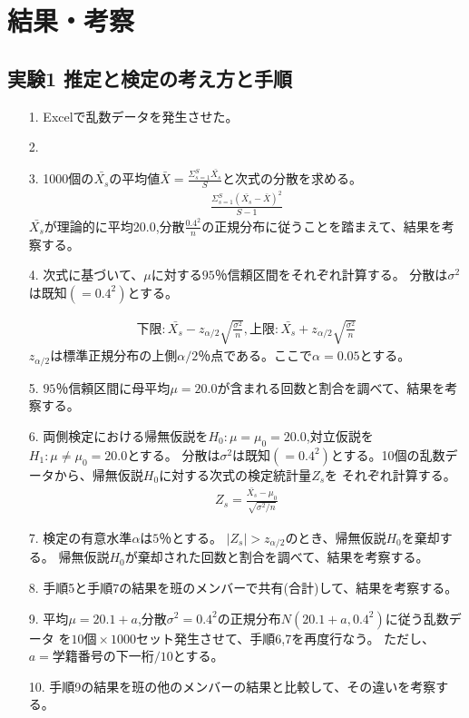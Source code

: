\documentclass[12pt]{jarticle}
\begin{document}
\section{結果・考察}
\subsection{実験1 推定と検定の考え方と手順}
\begin{itemize}
    \item [1.]Excelで乱数データを発生させた。
    \item [2.]
    \item [3.]1000個の$\bar{X_s}$の平均値$\bar{X}=\frac{\Sigma^{S}_{s=1}\bar{X_s}}{S}$と次式の分散を求める。
          \begin{eqnarray}
              \frac{\Sigma^{S}_{s=1}(\bar{X_s}-\bar{X})^2}{S-1}\nonumber
          \end{eqnarray}
          $\bar{X_s}$が理論的に平均$20.0$,分散$\frac{0.4^2}{n}$の正規分布に従うことを踏まえて、結果を考察する。
    \item [4.]次式に基づいて、$\mu$に対する$95％$信頼区間をそれぞれ計算する。
          分散は$\sigma^2$は既知$(=0.4^2)$とする。

          \begin{eqnarray}
              下限:\bar{X_s}-z_{\alpha/2}\sqrt{\frac{\sigma^2}{n}},　上限:\bar{X_s}+z_{\alpha/2}\sqrt{\frac{\sigma^2}{n}}\nonumber
          \end{eqnarray}
          $z_{\alpha/2}$は標準正規分布の上側$\alpha/2％$点である。ここで$\alpha=0.05$とする。
    \item [5.]$95％$信頼区間に母平均$\mu=20.0$が含まれる回数と割合を調べて、結果を考察する。
    \item [6.]両側検定における帰無仮説を$H_0:\mu=\mu_0=20.0$,対立仮説を$H_1:\mu\neq\mu_0=20.0$とする。
          分散は$\sigma^2$は既知$(=0.4^2)$とする。10個の乱数データから、帰無仮説$H_0$に対する次式の検定統計量$Z_s$を
          それぞれ計算する。
          \begin{eqnarray}
              Z_s=\frac{\bar{X_s}-\mu_0}{\sqrt{\sigma^2/n}}\nonumber
          \end{eqnarray}
    \item [7.]検定の有意水準$\alpha$は$5％$とする。
          $|Z_s|>z_{\alpha/2}$のとき、帰無仮説$H_0$を棄却する。
          帰無仮説$H_0$が棄却された回数と割合を調べて、結果を考察する。
    \item [8.]手順5と手順7の結果を班のメンバーで共有(合計)して、結果を考察する。
    \item [9.]平均$\mu=20.1+a$,分散$\sigma^2=0.4^2$の正規分布$N(20.1+a,0.4^2)$に従う乱数データ
          を$10個\times 1000セット$発生させて、手順6,7を再度行なう。
          ただし、$a=学籍番号の下一桁/10$とする。
    \item [10.]手順9の結果を班の他のメンバーの結果と比較して、その違いを考察する。
\end{itemize}
\end{document}
